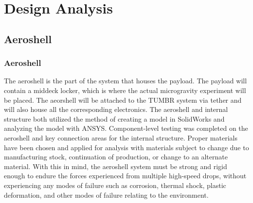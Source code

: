 
\section{Design Analysis}

\subsection{Aeroshell}

\subsubsection{Aeroshell}

\indent\indent The aeroshell is the part of the system that houses the payload. The payload will contain a middeck locker, which is where the actual microgravity experiment will be placed. The aeorshell will be attached to the TUMBR system via tether and will also house all the corresponding electronics. The aeroshell and internal structure both utilized the method of creating a model in SolidWorks and analyzing the model with ANSYS. Component-level testing was completed on the aeroshell and key connection areas for the internal structure. Proper materials have been chosen and applied for analysis with materials subject to change due to manufacturing stock, continuation of production, or change to an alternate material. With this in mind, the aeroshell system must be strong and rigid enough to endure the forces experienced from multiple high-speed drops, without experiencing any modes of failure such as corrosion, thermal shock, plastic deformation, and other modes of failure relating to the environment.

